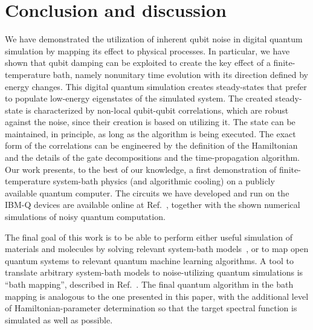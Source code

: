 \documentclass[twocolumn,amsmath,amssymb,pra]{revtex4-2}
\begin{document}
\section{Conclusion and discussion}
\label{sec:conclusion}
We have demonstrated the utilization of inherent qubit noise in digital quantum simulation
by mapping its effect to physical processes. 
In particular, we have shown that qubit damping
can be exploited to create the key effect of a finite-temperature bath,
namely nonunitary time evolution with its direction defined by energy changes.
This digital quantum simulation creates steady-states that prefer to populate low-energy eigenstates
of the simulated system.
The created steady-state is characterized by non-local qubit-qubit correlations,
which are robust against the noise, since their creation is based on utilizing it.
The state can be maintained, in principle, as long as the algorithm is being executed.
The exact form of the correlations can be engineered by the definition of the Hamiltonian
and the details of the gate decompositions and the time-propagation algorithm.
Our work presents, to the best of our knowledge,
a first demonstration of finite-temperature system-bath physics (and algorithmic cooling) on a publicly available quantum computer.
The circuits we have developed and run on the IBM-Q devices are available online at Ref.~\cite{qoqo_files_online},
together with the shown numerical simulations of noisy quantum computation.

The final goal of this work is to be able to perform either useful simulation of materials and molecules 
by solving relevant system-bath models~\cite{Wouters2016, Sun_2020, Rozenberg1996, Spin_Boson_Rev},
or to map open quantum systems to relevant quantum machine learning algorithms. 
A tool to translate arbitrary system-bath models to noise-utilizing quantum simulations
is ``bath mapping'', described in Ref.~\cite{Leppakangas2023}.
The final quantum algorithm in the bath mapping is analogous to the one presented in this paper,
with the additional level of Hamiltonian-parameter determination so that
the target spectral function is simulated as well as possible.
\end{document}

